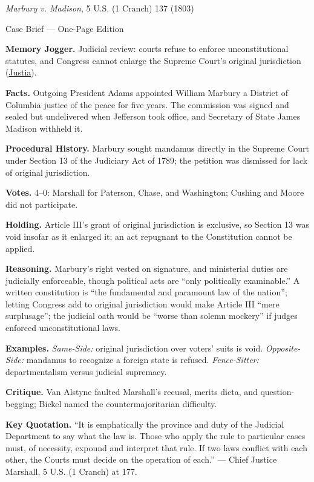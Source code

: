 \documentclass[12pt]{article}
\begin{document}
\begin{center}
{\Large \textit{Marbury v. Madison}, 5 U.S. (1 Cranch) 137 (1803)\par}
\vspace{0.3em}
{\normalsize Case Brief --- One-Page Edition\par}
\end{center}

\textbf{Memory Jogger.} Judicial review: courts refuse to enforce unconstitutional statutes, and Congress cannot enlarge the Supreme Court's original jurisdiction (\href{https://supreme.justia.com/cases/federal/us/5/137/}{Justia}).

\textbf{Facts.} Outgoing President Adams appointed William Marbury a District of Columbia justice of the peace for five years. The commission was signed and sealed but undelivered when Jefferson took office, and Secretary of State James Madison withheld it.

\textbf{Procedural History.} Marbury sought mandamus directly in the Supreme Court under Section 13 of the Judiciary Act of 1789; the petition was dismissed for lack of original jurisdiction.

\textbf{Votes.} 4--0: Marshall for Paterson, Chase, and Washington; Cushing and Moore did not participate.

\textbf{Holding.} Article III's grant of original jurisdiction is exclusive, so Section 13 was void insofar as it enlarged it; an act repugnant to the Constitution cannot be applied.

\textbf{Reasoning.} Marbury's right vested on signature, and ministerial duties are judicially enforceable, though political acts are ``only politically examinable.'' A written constitution is ``the fundamental and paramount law of the nation''; letting Congress add to original jurisdiction would make Article III ``mere surplusage''; the judicial oath would be ``worse than solemn mockery'' if judges enforced unconstitutional laws.

\textbf{Examples.} \emph{Same-Side:} original jurisdiction over voters' suits is void. \emph{Opposite-Side:} mandamus to recognize a foreign state is refused. \emph{Fence-Sitter:} departmentalism versus judicial supremacy.

\textbf{Critique.} Van Alstyne faulted Marshall's recusal, merits dicta, and question-begging; Bickel named the countermajoritarian difficulty.

\textbf{Key Quotation.} ``It is emphatically the province and duty of the Judicial Department to say what the law is. Those who apply the rule to particular cases must, of necessity, expound and interpret that rule. If two laws conflict with each other, the Courts must decide on the operation of each.'' --- Chief Justice Marshall, 5 U.S. (1 Cranch) at 177.
\end{document}

